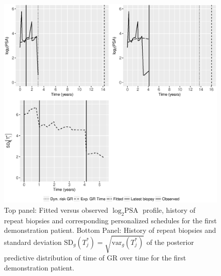 \begin{figure}
\centerline{
\includegraphics[width=\columnwidth]{images/prias_demo/case_911_t3.eps}
}
\caption{Top panel: Fitted versus observed $\log_2 \mbox{PSA}$ profile, history of repeat biopsies and corresponding personalized schedules for the first demonstration patient. Bottom Panel: History of repeat biopsies and standard deviation $\mbox{SD}_g(T^*_j) = \sqrt{\mbox{var}_g(T^*_j)}$ of the posterior predictive distribution of time of GR over time for the first demonstration patient.}
\label{fig : prias_demo_pid_911}
\end{figure}